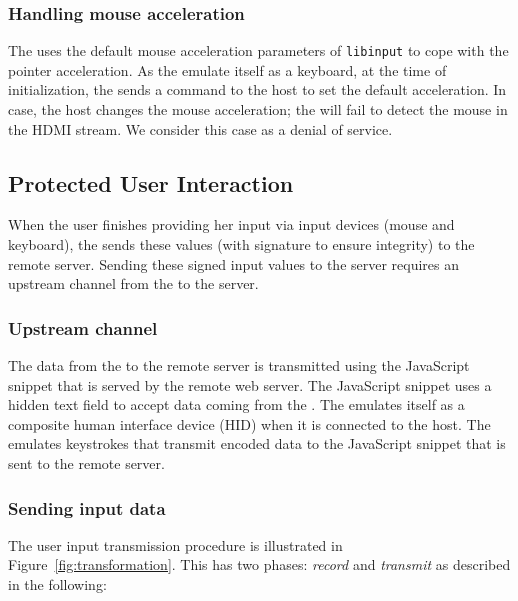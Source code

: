  
\subsubsection{\bfseries Handling mouse acceleration} The \device uses the default mouse acceleration parameters of \texttt{libinput} to cope with the pointer acceleration. As the \device emulate itself as a keyboard, at the time of initialization, the \device sends a command to the host to set the default acceleration. In case, the host changes the mouse acceleration; the \device will fail to detect the mouse in the HDMI stream. We consider this case as a denial of service.

\subsection{Protected User Interaction}
\label{sec:systemDesign:commit}

When the user finishes providing her input via input devices (mouse and keyboard), the \device sends these values (with signature to ensure integrity) to the remote server. Sending these signed input values to the server requires an upstream channel from the \device to the server.

\subsubsection{\bfseries Upstream channel}\label{sec:systemDesign:commit:upload} The data from the \device to the remote server is transmitted using the \name JavaScript snippet that is served by the remote web server. The \name JavaScript snippet uses a hidden text field to accept data coming from the \device. The \device emulates itself as a composite human interface device (HID) when it is connected to the host. The \device emulates keystrokes that transmit encoded data to the \name JavaScript snippet that is sent to the remote server.

\subsubsection{\bfseries Sending input data}\label{sec:systemDesign:commit:send}
The user input transmission procedure is illustrated in Figure~\ref{fig:transformation}. This has two phases: \emph{record} and \emph{transmit} as described in the following:

